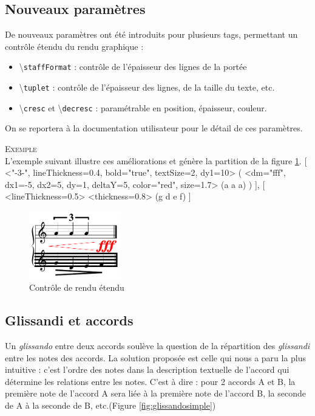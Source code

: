 \documentclass{article}
\newenvironment{gmncode}	{\vspace{-2mm}\small\verbatim}{\endverbatim\vspace{-2mm}}
\newcommand{\code}[1]		{{\small \texttt{#1}}}
\newcommand{\guidotag}[1]	{\textbackslash\code{#1}}
\newcommand{\exemple}		{\vspace{2mm}\hspace*{-6mm}\textsc{Exemple}}
\begin{document}
\subsection{Nouveaux paramètres}\label{subsubsec:attributs}

De nouveaux paramètres ont été introduits pour plusieurs tags, permettant un contrôle étendu du rendu graphique :
\begin{itemize}
\item \guidotag{staffFormat} : contrôle de l'épaisseur des lignes de la portée
\item \guidotag{tuplet} : contrôle de l'épaisseur des lignes, de la taille du texte, etc.
\item \guidotag{cresc} et \guidotag{decresc} : paramétrable en position, épaisseur, couleur.
\end{itemize}
On se reportera à la documentation utilisateur pour le détail de ces paramètres.

\exemple\\
L'exemple suivant illustre ces améliorations et génère la partition de la figure \ref{fig:nouveauxParams}.
\begin{gmncode}
{
  [
    \tuplet<"-3-", lineThickness=0.4,
        bold="true", textSize=2, dy1=10> (
      \cresc<dm="fff", dx1=-5, dx2=5,
          dy=1, deltaY=5, color="red",
          size=1.7> (a a a)
    )
  ],
  [
    \staffFormat<lineThickness=0.5>
    \decresc<thickness=0.8> (g d e f)
  ]
}
\end{gmncode}
\begin{figure}[h]
\centering
\includegraphics[width=40mm]{img/partitions/nouveauxParams.pdf}
\caption{Contrôle de rendu étendu}
\label{fig:nouveauxParams}
\end{figure}

\subsection{Glissandi et accords}\label{subsec:glissandiAccords}

Un \emph{glissando} entre deux accords soulève la question de la répartition des \emph{glissandi} entre les notes des accords. La solution proposée est celle qui nous a paru la plus intuitive : c'est l'ordre des notes dans la description textuelle de l'accord qui détermine les relations entre les notes. C'est à dire : pour 2 accords A et B, la première note de l'accord A sera liée à la première note de l'accord B, la seconde de A à la seconde de B, etc.(Figure \ref{fig:glissandosimple})
\end{document}
